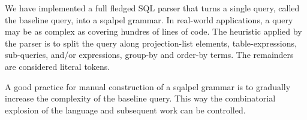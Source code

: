 \documentclass{cidr-2019}
\begin{document}
We have implemented a full fledged SQL parser that turns a single
query, called the baseline query, into a {\sc sqalpel} grammar. In
real-world applications, a query may be as complex as covering hundres
of lines of code. The heuristic applied by the parser is to split the
query along projection-list elements, table-expressions, sub-queries,
and/or expressions, group-by and order-by terms. The remainders are
considered literal tokens.



A good practice for manual construction of a {\sc sqalpel} grammar is
to gradually increase the complexity of the baseline query. This way
the combinatorial explosion of the language and subsequent work can be
controlled.

%
\end{document}
